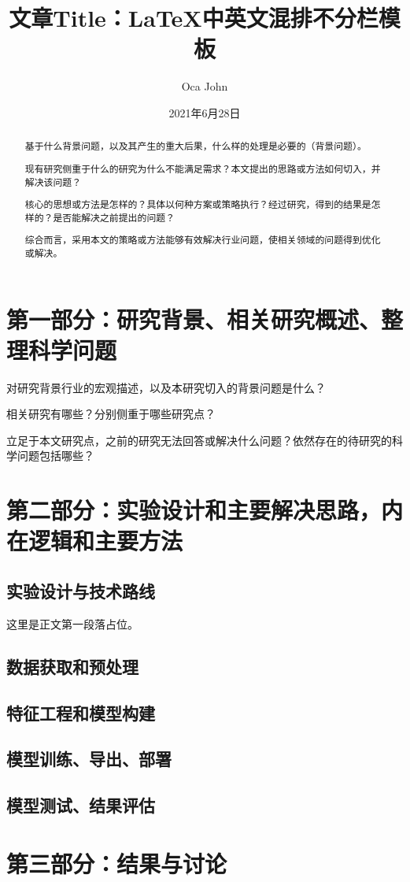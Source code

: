 \documentclass[a4paper,10pt]{article}
\title{文章Title：LaTeX中英文混排不分栏模板}
\author{Oca John}
\date{2021年6月28日}
\begin{document}
	\maketitle							%
		
	\begin{abstract}
		
		基于什么背景问题，以及其产生的重大后果，什么样的处理是必要的（背景问题）。
		
		现有研究侧重于什么的研究为什么不能满足需求？本文提出的思路或方法如何切入，并解决该问题？
		
		核心的思想或方法是怎样的？具体以何种方案或策略执行？经过研究，得到的结果是怎样的？是否能解决之前提出的问题？
		
		综合而言，采用本文的策略或方法能够有效解决行业问题，使相关领域的问题得到优化或解决。
		
	\end{abstract}
	
	\section{第一部分：研究背景、相关研究概述、整理科学问题}
	
	对研究背景行业的宏观描述，以及本研究切入的背景问题是什么？
	
	相关研究有哪些？分别侧重于哪些研究点？
	
	立足于本文研究点，之前的研究无法回答或解决什么问题？依然存在的待研究的科学问题包括哪些？
	
	\section{第二部分：实验设计和主要解决思路，内在逻辑和主要方法}
	
	\subsection{实验设计与技术路线}
	
	这里是正文第一段落占位。
	
	\subsection{数据获取和预处理}
	
	\subsection{特征工程和模型构建}
	
	\subsection{模型训练、导出、部署}
	
	\subsection{模型测试、结果评估}
	
	\section{第三部分：结果与讨论}
	
\end{document}
